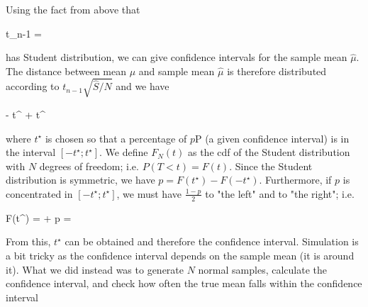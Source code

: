 Using the fact from above that 

\bee
t_{n-1} = 
\eee

has Student distribution, we can give confidence intervals for the sample mean $\hat \mu$. The distance between mean $\mu$ and sample mean $\hat \mu$ is therefore distributed according to $t_{n-1} \sqrt{\hat S / N}$ and we have

\bee
\hat \mu - t^\star {} \leq \mu \leq \hat \mu + t^\star {}
\eee

where $t^\star$ is chosen so that a percentage of $p$P (a given confidence interval) is in the interval $[-t^\star; t^\star]$. We define $F_N(t)$ as the cdf of the Student distribution with $N$ degrees of freedom; i.e. $P(T<t) = F(t)$. Since the Student distribution is symmetric, we have $p = F(t^\star) - F(-t^\star)$. Furthermore, if $p$ is concentrated in $[-t^\star; t^\star]$, we must have $\frac{1-p}{2}$ to "the left" and to "the right"; i.e.

\bee
F(t^\star) =  + p = 
\eee

From this, $t^\star$ can be obtained and therefore the confidence interval. Simulation is a bit tricky as the confidence interval depends on the sample mean (it is around it). What we did instead was to generate $N$ normal samples, calculate the confidence interval, and check how often the true mean falls within the confidence interval  



